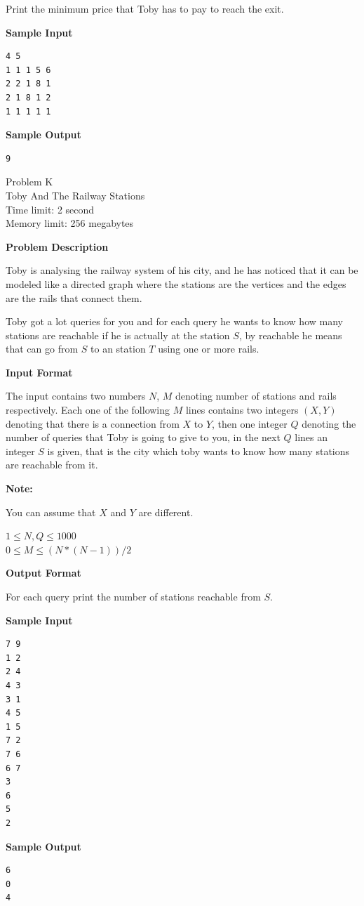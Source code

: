 \documentclass[11pt]{article}
\begin{document}
Print the minimum price that Toby has to pay to reach the exit.

\textbf{\large Sample Input}

\begin{verbatim}
4 5
1 1 1 5 6
2 2 1 8 1
2 1 8 1 2
1 1 1 1 1
\end{verbatim}

\textbf{\large Sample Output}

\begin{verbatim}
9
\end{verbatim}

\newpage
        \begin{center}
            {\LARGE Problem K}\\
            {\Large Toby And The Railway Stations}\\
            {Time limit: 2 second}\\
            {Memory limit: 256 megabytes}
        \end{center}\textbf{\large Problem Description}

Toby is analysing the railway system of his city, and he has noticed that it can
be modeled like a directed graph where the stations are the vertices and the edges
are the rails that connect them.

Toby got a lot queries for you and for each query he wants to know how many
stations are reachable if he is actually at the station $S$, by reachable he
means that can go from $S$ to an station $T$ using one or more rails.

\textbf{\large Input Format}

The input contains two numbers $N$, $M$ denoting number of stations and rails
respectively. Each one of the following $M$ lines contains two integers $(X, Y)$
denoting that there is a connection from $X$ to $Y$, then one integer $Q$
denoting the number of queries that Toby is going to give to you, in the next $Q$
lines an integer $S$ is given, that is the city which toby wants to know how
many stations are reachable from it.

\textbf{\large Note:}

You can assume that $X$ and $Y$ are different.

$1 \le N, Q \le 1000$ \\
$0 \le M \le (N * (N - 1)) / 2$ %

\textbf{\large Output Format}

For each query print the number of stations reachable from $S$.

\textbf{\large Sample Input}

\begin{verbatim}
7 9
1 2
2 4
4 3
3 1
4 5
1 5
7 2
7 6
6 7
3
6
5
2
\end{verbatim}

\textbf{\large Sample Output}

\begin{verbatim}
6
0
4
\end{verbatim}

\newpage
    
\end{document}
